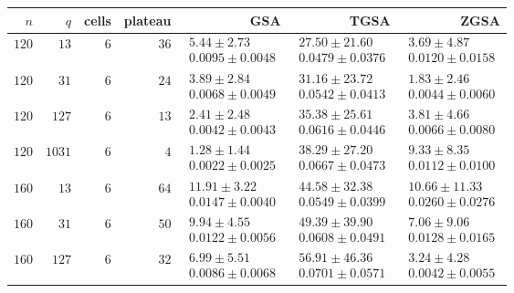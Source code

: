 \begin{tabular}{@{}rrrrrrr@{}}
  \toprule
  $n$ & $q$ & cells & plateau & GSA & TGSA & ZGSA \\
  \midrule
  $120$ & $13$ & $6$ & $36$ & $\substack{5.44\mathbin{\pm}2.73\\0.0095\mathbin{\pm}0.0048}$ & $\substack{27.50\mathbin{\pm}21.60\\0.0479\mathbin{\pm}0.0376}$ & $\substack{3.69\mathbin{\pm}4.87\\0.0120\mathbin{\pm}0.0158}$ \\
  $120$ & $31$ & $6$ & $24$ & $\substack{3.89\mathbin{\pm}2.84\\0.0068\mathbin{\pm}0.0049}$ & $\substack{31.16\mathbin{\pm}23.72\\0.0542\mathbin{\pm}0.0413}$ & $\substack{1.83\mathbin{\pm}2.46\\0.0044\mathbin{\pm}0.0060}$ \\
  $120$ & $127$ & $6$ & $13$ & $\substack{2.41\mathbin{\pm}2.48\\0.0042\mathbin{\pm}0.0043}$ & $\substack{35.38\mathbin{\pm}25.61\\0.0616\mathbin{\pm}0.0446}$ & $\substack{3.81\mathbin{\pm}4.66\\0.0066\mathbin{\pm}0.0080}$ \\
  $120$ & $1031$ & $6$ & $4$ & $\substack{1.28\mathbin{\pm}1.44\\0.0022\mathbin{\pm}0.0025}$ & $\substack{38.29\mathbin{\pm}27.20\\0.0667\mathbin{\pm}0.0473}$ & $\substack{9.33\mathbin{\pm}8.35\\0.0112\mathbin{\pm}0.0100}$ \\
  $160$ & $13$ & $6$ & $64$ & $\substack{11.91\mathbin{\pm}3.22\\0.0147\mathbin{\pm}0.0040}$ & $\substack{44.58\mathbin{\pm}32.38\\0.0549\mathbin{\pm}0.0399}$ & $\substack{10.66\mathbin{\pm}11.33\\0.0260\mathbin{\pm}0.0276}$ \\
  $160$ & $31$ & $6$ & $50$ & $\substack{9.94\mathbin{\pm}4.55\\0.0122\mathbin{\pm}0.0056}$ & $\substack{49.39\mathbin{\pm}39.90\\0.0608\mathbin{\pm}0.0491}$ & $\substack{7.06\mathbin{\pm}9.06\\0.0128\mathbin{\pm}0.0165}$ \\
  $160$ & $127$ & $6$ & $32$ & $\substack{6.99\mathbin{\pm}5.51\\0.0086\mathbin{\pm}0.0068}$ & $\substack{56.91\mathbin{\pm}46.36\\0.0701\mathbin{\pm}0.0571}$ & $\substack{3.24\mathbin{\pm}4.28\\0.0042\mathbin{\pm}0.0055}$ \\

\end{tabular}
